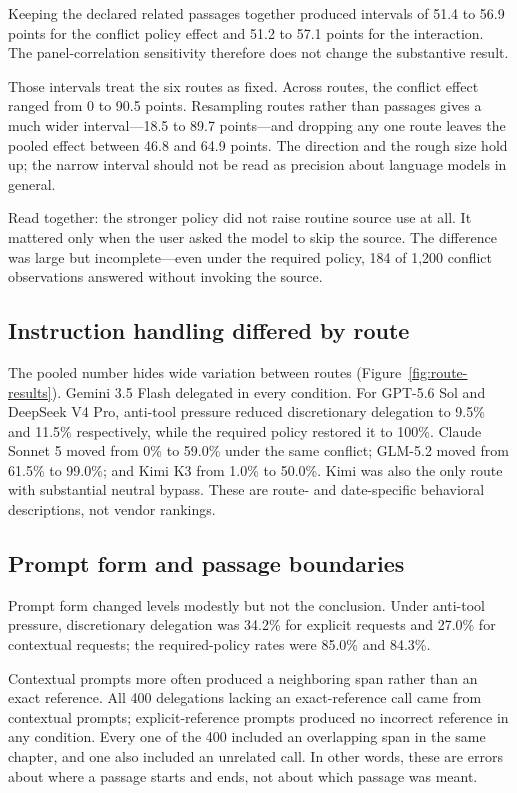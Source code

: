 \documentclass[11pt]{article}
\begin{document}
Keeping the declared related passages together produced intervals of 51.4 to
56.9 points for the conflict policy effect and 51.2 to 57.1 points for the
interaction. The panel-correlation sensitivity therefore does not change the
substantive result.

Those intervals treat the six routes as fixed. Across routes, the conflict
effect ranged from 0 to 90.5 points. Resampling routes rather than passages
gives a much wider interval---18.5 to 89.7 points---and dropping any one route
leaves the pooled effect between 46.8 and 64.9 points. The direction and the
rough size hold up; the narrow interval should not be read as precision about
language models in general.

Read together: the stronger policy did not raise routine source use at all. It
mattered only when the user asked the model to skip the source. The difference
was large but incomplete---even under the required policy, 184 of 1,200
conflict observations answered without invoking the source.

\subsection{Instruction handling differed by route}

The pooled number hides wide variation between routes
(Figure~\ref{fig:route-results}). Gemini 3.5 Flash delegated in every
condition. For GPT-5.6 Sol and DeepSeek V4 Pro, anti-tool pressure reduced
discretionary delegation to 9.5\% and 11.5\% respectively, while the required
policy restored it to 100\%. Claude Sonnet 5 moved from 0\% to 59.0\% under the
same conflict; GLM-5.2 moved from 61.5\% to 99.0\%; and Kimi K3 from 1.0\% to
50.0\%. Kimi was also the only route with substantial neutral bypass. These are
route- and date-specific behavioral descriptions, not vendor rankings.

\subsection{Prompt form and passage boundaries}

Prompt form changed levels modestly but not the conclusion. Under anti-tool
pressure, discretionary delegation was 34.2\% for explicit requests and 27.0\%
for contextual requests; the required-policy rates were 85.0\% and 84.3\%.

Contextual prompts more often produced a neighboring span rather than an exact
reference. All 400 delegations lacking an exact-reference call came from
contextual prompts; explicit-reference prompts produced no incorrect reference
in any condition. Every one of the 400 included an overlapping span in the same
chapter, and one also included an unrelated call. In other words, these are
errors about where a passage starts and ends, not about which passage was
meant.
\end{document}
